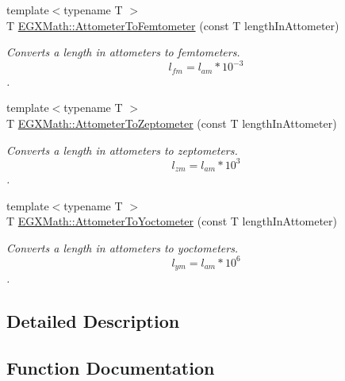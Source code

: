 \begin{DoxyCompactItemize}
{\footnotesize template$<$typename T $>$ }\\T \mbox{\hyperlink{group___e_g_x_math-_conversions-_length_conversions-_attometer-_s_i_gafbaa622bc31794c382e244942fa1d445}{E\+G\+X\+Math\+::\+Attometer\+To\+Femtometer}} (const T length\+In\+Attometer)
\begin{DoxyCompactList}\small\item\em Converts a length in attometers to femtometers. \[ l_{fm}=l_{am} * 10^{-3} \]. \end{DoxyCompactList}\item 
{\footnotesize template$<$typename T $>$ }\\T \mbox{\hyperlink{group___e_g_x_math-_conversions-_length_conversions-_attometer-_s_i_ga88493321ed49951744e5afe2b0bf7e5c}{E\+G\+X\+Math\+::\+Attometer\+To\+Zeptometer}} (const T length\+In\+Attometer)
\begin{DoxyCompactList}\small\item\em Converts a length in attometers to zeptometers. \[ l_{zm}=l_{am} * 10^{3} \]. \end{DoxyCompactList}\item 
{\footnotesize template$<$typename T $>$ }\\T \mbox{\hyperlink{group___e_g_x_math-_conversions-_length_conversions-_attometer-_s_i_gaf325d426b8544c973b0f140b0d4e0f06}{E\+G\+X\+Math\+::\+Attometer\+To\+Yoctometer}} (const T length\+In\+Attometer)
\begin{DoxyCompactList}\small\item\em Converts a length in attometers to yoctometers. \[ l_{ym}=l_{am} * 10^{6} \]. \end{DoxyCompactList}\end{DoxyCompactItemize}


\subsection{Detailed Description}


\subsection{Function Documentation}
\mbox{\label{group___e_g_x_math-_conversions-_length_conversions-_attometer-_s_i_gaff6439c15e3bb4a90595864e814960a7}} 
